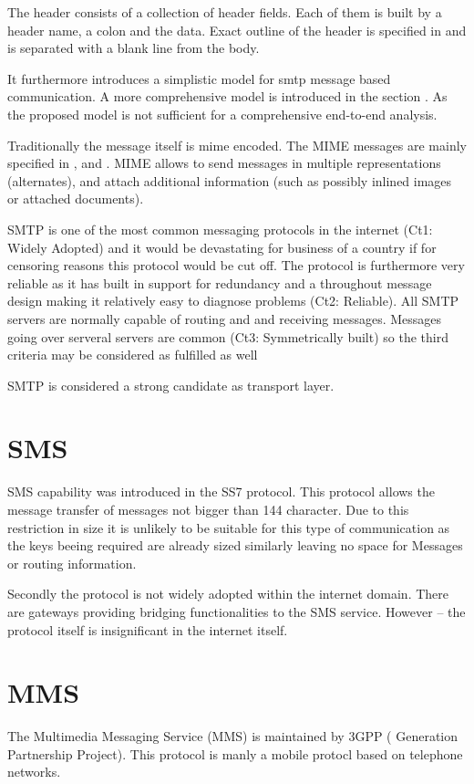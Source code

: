 The header consists of a collection of header fields. Each of them is built by a header name, a colon and the data. Exact outline of the header is specified in \cite{RFC5322} and is separated with a blank line from the body. 

It \cite{RFC5321} furthermore introduces a simplistic model for smtp message based communication. A more comprehensive model is introduced in the section . As the proposed model is not sufficient for a comprehensive end-to-end analysis.\par

Traditionally the message itself is mime encoded. The MIME messages are mainly specified in \cite{RFC2045}, and \cite{RFC2046}. MIME allows to send messages in multiple representations (alternates), and attach additional information (such as possibly inlined images or attached documents). 

SMTP is one of the most common messaging protocols in the internet (Ct1: Widely Adopted) and it would be devastating for business of a country if for censoring reasons this protocol would be cut off. The protocol is furthermore very reliable as it has built in support for redundancy and a throughout message design making it relatively easy to diagnose problems (Ct2: Reliable). All SMTP servers are normally capable of routing and and receiving messages. Messages going over serveral servers are common (Ct3: Symmetrically built) so the third criteria may be considered as fulfilled as well

SMTP is considered a strong candidate as transport layer.  

\section{SMS}
SMS capability was introduced in the SS7 protocol. This protocol allows the message transfer of messages not bigger than 144 character. Due to this restriction in size it is unlikely to be suitable for this type of communication as the keys beeing required are already sized similarly leaving no space for Messages or routing information.

Secondly the protocol is not widely adopted within the internet domain. There are gateways providing bridging functionalities to the SMS service. However -- the protocol itself is insignificant in the internet itself. 


\section{MMS}
The Multimedia Messaging Service (MMS) is maintained by 3GPP ( Generation Partnership Project). This protocol is manly a mobile protocl based on telephone networks.

